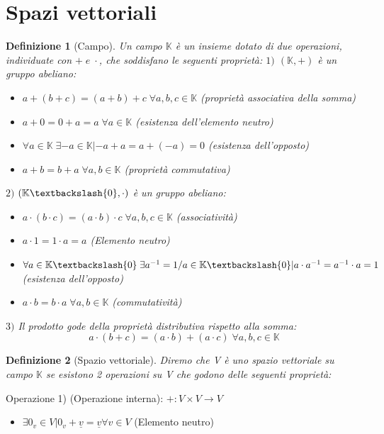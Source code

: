 \documentclass[12pt]{article}
\newenvironment{para}{\begin{adjustwidth}{13mm}{}}{\end{adjustwidth}}
\newtheorem{Definizione}{Definizione}[subsection]
\begin{document}
\section{Spazi vettoriali}
\begin{para}
\begin{Definizione}[Campo]
Un campo $\mathbb{K}$ è un insieme dotato di due operazioni, individuate con $+ \; e \; \cdot$, che soddisfano le seguenti proprietà:\newline
$1)$ $(\mathbb{K}, +)$ è un gruppo abeliano:
\begin{itemize}
    \item $a+(b+c) = (a+b)+c \; \forall a,b,c \in \mathbb{K}$ (proprietà associativa della somma)
    \item $a+0 = 0+a = a \; \forall a \in \mathbb{K}$ (esistenza dell'elemento neutro)
    \item $\forall a \in \mathbb{K} \; \exists -a \in \mathbb{K} | -a+a = a+(-a) = 0$ (esistenza dell'opposto)
    \item $a+b = b+a \; \forall a,b \in \mathbb{K}$ (proprietà commutativa)
\end{itemize}
$2)$ $(\mathbb{K} \textbackslash \{0\}, \cdot)$ è un gruppo abeliano:
\begin{itemize}
    \item $a\cdot(b\cdot c) = (a\cdot b)\cdot c \; \forall a,b,c \in \mathbb{K}$ (associatività)
    \item $a \cdot 1 = 1 \cdot a = a$ (Elemento neutro)
    \item $\forall a \in \mathbb{K} \textbackslash \{0\} \; \exists a^{-1} = 1/a \in \mathbb{K} \textbackslash \{0\} | a \cdot a^{-1} = a^{-1} \cdot a = 1$ (esistenza dell'opposto)
    \item $a \cdot b = b \cdot a \; \forall a,b \in \mathbb{K}$ (commutatività)
\end{itemize}
$3)$ Il prodotto gode della proprietà distributiva rispetto alla somma: $$a \cdot (b+c) = (a\cdot b) + (a \cdot c) \; \forall a,b,c \in \mathbb{K}$$
\end{Definizione}
\begin{Definizione}[Spazio vettoriale]
Diremo che V è uno spazio vettoriale su campo $\mathbb{K}$ se esistono 2 operazioni su V che godono delle seguenti proprietà:
\end{Definizione}
Operazione 1) (Operazione interna): $+ : V\times V \rightarrow V$
\begin{itemize}
  \item $\exists0_v\in V | 0_v + \underline{v} = \underline{v} \forall v \in V$ (Elemento neutro)

\end{itemize}
\end{para}
\end{document}
